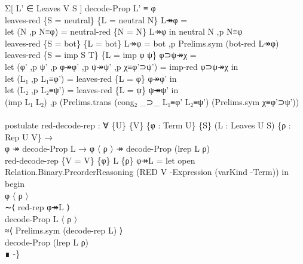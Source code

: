 {\begin{code}
{\>                     Σ[ L' ∈ Leaves V S ] decode-Prop L' ≡ φ\<\\
\>leaves-red \{S = neutral\} \{L = neutral N\} L↠φ = \<\\
\>  let (N ,p N≡φ) = neutral-red \{N = N\} L↠φ in neutral N ,p N≡φ\<\\
\>leaves-red \{S = bot\} \{L = bot\} L↠φ = bot ,p Prelims.sym (bot-red L↠φ)\<\\
\>leaves-red \{S = imp S T\} \{L = imp φ ψ\} φ⊃ψ↠χ = \<\\
\>  let (φ' ,p ψ' ,p φ↠φ' ,p ψ↠ψ' ,p χ≡φ'⊃ψ') = imp-red φ⊃ψ↠χ in \<\\
\>  let (L₁ ,p L₁≡φ') = leaves-red \{L = φ\} φ↠φ' in \<\\
\>  let (L₂ ,p L₂≡ψ') = leaves-red \{L = ψ\} ψ↠ψ' in \<\\
\>  (imp L₁ L₂) ,p (Prelims.trans (cong₂ \_⊃\_ L₁≡φ' L₂≡ψ') (Prelims.sym χ≡φ'⊃ψ'))\<\\
\>\<\\
\>postulate red-decode-rep : ∀ \{U\} \{V\} \{φ : Term U\} \{S\} (L : Leaves U S) \{ρ : Rep U V\} →\<\\
\>                         φ ↠ decode-Prop L → φ 〈 ρ 〉 ↠ decode-Prop (lrep L ρ)\<\\
\>red-decode-rep \{V = V\} \{φ\} L \{ρ\} φ↠L = let open Relation.Binary.PreorderReasoning (RED V -Expression (varKind -Term)) in \<\\
\>  begin\<\\
\>    φ 〈 ρ 〉\<\\
\>  ∼⟨ red-rep φ↠L ⟩\<\\
\>    decode-Prop L 〈 ρ 〉\<\\
\>  ≈⟨ Prelims.sym (decode-rep L) ⟩\<\\
\>    decode-Prop (lrep L ρ)\<\\
\>  ∎ -\}}\<%
\end{code}
}

